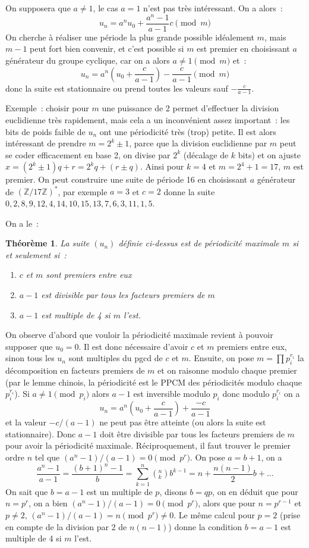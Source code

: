 \documentclass[a4paper,11pt]{article}
\newtheorem{thm}{Théorème}
\newcommand{\Z}{{\mathbb{Z}}}
\begin{document}
On supposera que $a\neq 1$, le cas $a=1$ n'est pas tr\`es
int\'eressant. On a alors~:
$$ u_n=a^n u_0 + \frac{a^n-1}{a-1} c \pmod m$$
On cherche \`a r\'ealiser une p\'eriode la plus grande possible
id\'ealement $m$, mais $m-1$ peut fort bien convenir, et c'est
possible si $m$ est premier en choisissant 
$a$ g\'en\'erateur du groupe cyclique, car on a alors $a\neq 1 \pmod m$ et~:
$$ u_n=a^n (u_0 + \frac{c}{a-1}) - \frac{c}{a-1}  \pmod m$$
donc la suite est stationnaire ou prend toutes les valeurs sauf $- \frac{c}{a-1} $.

Exemple~: choisir pour $m$ une puissance de 2 permet d'effectuer
la division euclidienne tr\`es rapidement, mais cela a un
inconv\'enient assez important~: les bits de poids faible
de $u_n$ ont une p\'eriodicit\'e tr\`es (trop) petite.
Il est alors int\'eressant de prendre $m=2^k \pm 1$, parce
que la division euclidienne par $m$ peut se coder efficacement en base
2, on divise par $2^k$ (d\'ecalage de $k$ bits) et on ajuste
$x=(2^k \pm 1)q+r=2^k q + (r \pm q)$.
Ainsi pour $k=4$ et $m=2^4+1=17$, $m$ est premier.
On peut construire une suite de p\'eriode 16 en choisissant $a$ g\'en\'erateur
de $(\Z/17\Z)^*$, par exemple $a=3$ et $c=2$ donne la suite
$0,2,8,9,12,4,14,10,15,13,7,6,3,11,1,5$.

On a le~:
\begin{thm}
La suite $(u_n)$ définie ci-dessus est de périodicité maximale $m$ si
et seulement si~:
\begin{enumerate}
\item $c$ et $m$ sont premiers entre eux
\item $a-1$ est divisible par tous les facteurs premiers de $m$
\item $a-1$ est multiple de 4 si $m$ l'est.
\end{enumerate}
\end{thm}
On observe d'abord que vouloir la périodicité maximale revient
à pouvoir supposer que $u_0=0$. 
Il est donc nécessaire d'avoir $c$
et $m$ premiers entre eux, sinon tous les $u_n$ sont multiples du
pgcd de $c$ et $m$. Ensuite, on pose $m=\prod p_i^{r_i}$ la
décomposition en facteurs premiers de $m$ et on raisonne modulo
chaque premier (par le lemme chinois, la p\'eriodicit\'e
est le PPCM des p\'eriodicit\'es modulo chaque $p_i^{r_i}$). 
Si $a\neq 1 \pmod p_i$
alors $a-1$ est inversible modulo $p_i$ donc modulo 
$p_i^{r_i}$ on a
$$ u_n=a^n (u_0 + \frac{c}{a-1}) + \frac{-c}{a-1}  $$
et la valeur $-c/(a-1)$ ne peut pas \^etre atteinte
(ou alors la suite est stationnaire).
Donc $a-1$ doit \^etre divisible par tous les facteurs premiers de $m$
pour avoir la p\'eriodicit\'e maximale.
R\'eciproquement, il faut trouver le premier ordre $n$ tel que
$(a^n-1)/(a-1)=0 \pmod{p^r}$. On pose $a=b+1$, on a
$$ \frac{a^n-1}{a-1}=\frac{(b+1)^n-1}{b} = \sum_{k=1}^n
\left(^n_k\right) b^{k-1} = n +\frac{n(n-1)}{2}b +... $$
On sait que $b=a-1$ est un multiple de $p$, disons $b=qp$, on en d\'eduit que
pour $n=p^r$, on a bien $(a^n-1)/(a-1)=0 \pmod{p^r}$, alors que
pour $n=p^{r-1}$ et $p\neq 2$, $(a^n-1)/(a-1)=n \pmod{p^r} \neq 0$.
Le m\^eme calcul pour $p=2$ (prise en compte de la division par 2 de
$n(n-1)$) donne la condition $b=a-1$ est multiple de 4 si $m$ l'est.
\end{document}
